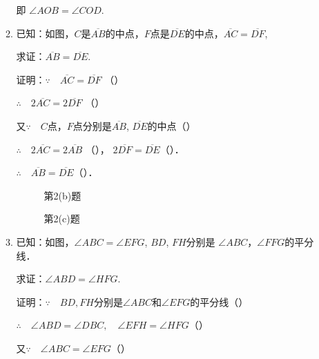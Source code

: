 \begin{enumerate}
\begin{enumerate}
即 $\angle AOB=\angle COD$.

\item 已知：如图，$C$是$\overline{AB}$的中点，$F$点是$\overline{DE}$的中点，$\overline{AC}=\overline{DF}$, 

求证：$\overline{AB}=\overline{DE}$.

证明：$\because\quad \overline{AC}=\overline{DF}$ （\qquad）

$\therefore\quad 2\overline{AC}=2\overline{DF}$ （\qquad）

又$\because\quad C$点，$F$点分别是$\overline{AB}$, $\overline{DE}$的中点（\qquad）

$\therefore\quad 2\overline{AC}=2\overline{AB}$ （\qquad），
$2\overline{DF}=\overline{DE}$（\qquad）．

$\therefore\quad \overline{AB}=\overline{DE}$（\qquad）．

\begin{figure}[htp]\centering
    \begin{minipage}[t]{0.48\textwidth}
    \centering
{}
    \caption*{第2(b)题}
    \end{minipage}
    \begin{minipage}[t]{0.48\textwidth}
    \centering
    \caption*{第2(c)题}
    \end{minipage}
    \end{figure}


\item 已知：如图，$\angle ABC=\angle EFG$, $BD$, $FH$分别是
$\angle ABC$，$\angle FFG$的平分线．

求证：$\angle ABD=\angle HFG$.

证明：$\because\quad BD, FH$分别是$\angle ABC$和$\angle EFG$的平分线（\qquad ）

$\therefore\quad \angle ABD=\angle DBC,\quad \angle EFH=\angle HFG$（\qquad）

又$\because\quad \angle ABC=\angle EFG$（\qquad）


\end{enumerate}
\end{enumerate}
